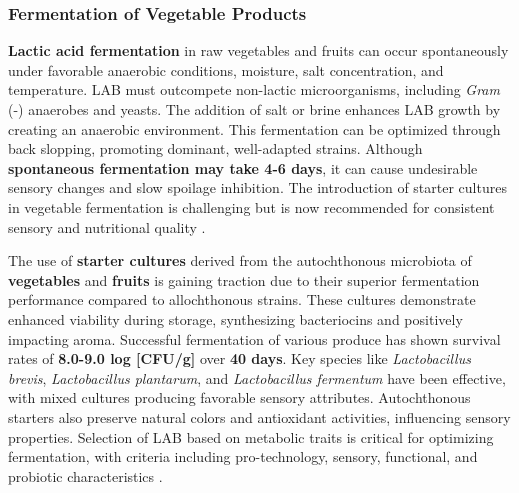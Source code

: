 \subsubsection{Fermentation of Vegetable Products}
\textbf{Lactic acid fermentation} in raw vegetables and fruits can occur spontaneously under favorable anaerobic conditions, moisture, salt concentration, and temperature. LAB must outcompete non-lactic microorganisms, including \textit{Gram} (-) anaerobes and yeasts. The addition of salt or brine enhances LAB growth by creating an anaerobic environment. This fermentation can be optimized through back slopping, promoting dominant, well-adapted strains. Although \textbf{spontaneous fermentation may take 4-6 days}, it can cause undesirable sensory changes and slow spoilage inhibition. The introduction of starter cultures in vegetable fermentation is challenging but is now recommended for consistent sensory and nutritional quality \cite*{L8-VegFruit}.

The use of \textbf{starter cultures} derived from the autochthonous microbiota of \textbf{vegetables} and \textbf{fruits} is gaining traction due to their superior fermentation performance compared to allochthonous strains. These cultures demonstrate enhanced viability during storage, synthesizing bacteriocins and positively impacting aroma. Successful fermentation of various produce has shown survival rates of \textbf{8.0-9.0 log [CFU/g]} over \textbf{40 days}. Key species like \textit{Lactobacillus brevis}, \textit{Lactobacillus plantarum}, and \textit{Lactobacillus fermentum} have been effective, with mixed cultures producing favorable sensory attributes. Autochthonous starters also preserve natural colors and antioxidant activities, influencing sensory properties. Selection of LAB based on metabolic traits is critical for optimizing fermentation, with criteria including pro-technology, sensory, functional, and probiotic characteristics \cite*{L8-VegFruit}. 



 